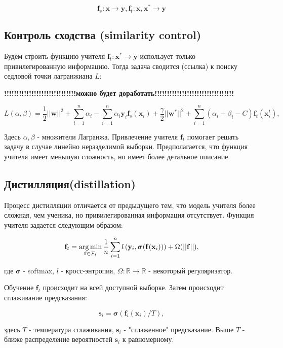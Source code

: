 \documentclass[12pt,twoside]{article}
\begin{document}
$$ \mathbf{f}_s: \mathbf{x} \rightarrow \mathbf{y},   \mathbf{f}_t: \mathbf{x}, \mathbf{x}^* \rightarrow \mathbf{y}$$

\subsection{Контроль сходства (similarity control)}

Будем строить функцию учителя $  \mathbf{f}_t:  \mathbf{x}^* \rightarrow \mathbf{y} $ использует только привилегированную информацию. Тогда задача сводится (ссылка) к поиску седловой точки лагранжиана $L$:

\textbf{!!!!!!!!!!!!!!!!!!!!!!!!!!!!!можно будет доработать!!!!!!!!!!!!!!!!!!!!!!!!!!!!!!!!}

$$ L(\alpha, \beta) = \frac{1}{2} || \mathbf{w}||^2  + \sum\limits_{i=1}^n \alpha_i - \sum\limits_{i=1}^n \alpha_i \mathbf{y}_i 
\mathbf{f}_s(\mathbf{x}_i) + \frac{\gamma}{2} || \mathbf{w}^*||^2  + \sum\limits_{i=1}^n (\alpha_i +\beta_i -C) \mathbf{f}_t (\mathbf{x}_i^t) ,                                                           $$

Здесь $\alpha, \beta$ - множители Лагранжа. Привлечение учителя $\mathbf{f}_t$ помогает решать задачу в случае линейно 
неразделимой выборки. Предполагается, что функция учителя имеет меньшую сложность, но имеет более детальное описание.

\subsection{Дистилляция(distillation)}
Процесс дистилляции отличается от предыдущего тем, что модель учителя более сложная, чем ученика, но привилегированная информация отсутствует. Функция учителя задается следующим образом:

$$ \mathbf{f}_t = \argmin\limits_{\mathbf{f} \in \mathcal{F}_t} \frac{1}{n} \sum\limits_{i=1}^n l
\left(\mathbf{y}_i, \boldsymbol{\sigma}(\mathbf{f}(\mathbf{x}_i)) \right) 
+ \Omega (|| \mathbf{f}||),
$$

где $  \boldsymbol{\sigma} $ - softmax, $l$ - кросс-энтропия, $\Omega : \mathbb{R} \rightarrow \mathbb{R} $ - некоторый регуляризатор.

Обучение $\mathbf{f}_t$ происходит на всей доступной выборке. Затем происходит сглаживание предсказания:

$$ \mathbf{s}_i =  \boldsymbol{\sigma} (\mathbf{f}_i (\mathbf{x}_i)/ T), $$

здесь $T$ - температура сглаживания, $\mathbf{s}_i$ - "сглаженное" предсказание. Выше $T$ - ближе распределение вероятностей $\mathbf{s}_i$ к равномерному.
\end{document}
